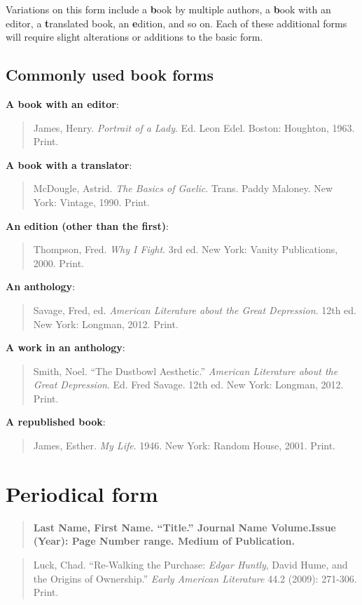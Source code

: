 Variations on this form include a {\textbf book by multiple authors}, a {\textbf book with an editor}, a {\textbf translated book}, an {\textbf edition}, and so on. Each of these additional forms will require slight alterations or additions to the basic form. 

\subsection{Commonly used book forms}

\textbf{A book with an editor}: 
\begin{quote}
James, Henry. \emph{Portrait of a Lady}. Ed. Leon Edel. Boston: Houghton,  1963. Print.
\end{quote}

\textbf{A book with a translator}: 
\begin{quote}
McDougle, Astrid. \emph{The Basics of Gaelic}. Trans. Paddy Maloney. New  York: Vintage, 1990. Print.
\end{quote}


\textbf{An edition (other than the first)}:
\begin{quote}
Thompson, Fred. \emph{Why I Fight}. 3rd ed. New York: Vanity Publications,  2000. Print.
\end{quote}

\textbf{An anthology}: 
\begin{quote}
Savage, Fred, ed. \emph{American Literature about the Great Depression}. 12th  ed. New York: Longman, 2012. Print.
\end{quote}

\textbf{A work in an anthology}: 
\begin{quote}
Smith, Noel. ``The Dustbowl Aesthetic.'' \emph{American Literature about the  Great Depression}. Ed. Fred Savage. 12th ed. New York: Longman,  2012. Print.
\end{quote}

\textbf{A republished book}: 
\begin{quote}
James, Esther. \emph{My Life}. 1946. New York: Random House, 2001. Print.
\end{quote}


\section{Periodical form}
\begin{quote}
\textbf{Last Name, First Name. ``Title.'' Journal Name Volume.Issue  (Year): Page Number range. Medium of Publication.}
\end{quote}
\medskip
\medskip
\begin{quote}
Luck, Chad. ``Re-Walking the Purchase: \emph{Edgar Huntly}, David Hume, and  the Origins of Ownership.'' \emph{Early American Literature} 44.2 (2009):  271-306. Print.
\end{quote}

